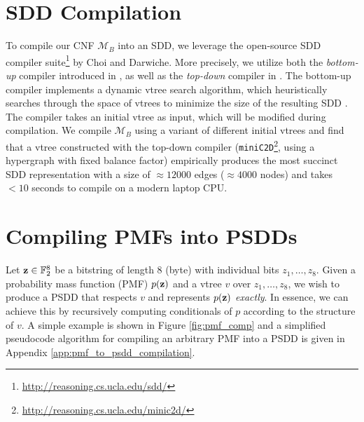 \section{SDD Compilation}
To compile our CNF $\mathcal{M}_B$ into an SDD, we leverage the open-source SDD compiler suite\footnote{\url{http://reasoning.cs.ucla.edu/sdd/}} by Choi and Darwiche. More precisely, we utilize both the \textit{bottom-up} compiler introduced in \cite{dynamic_min_choi}, as well as the \textit{top-down} compiler in \cite{top_down_comp}. The bottom-up compiler implements a dynamic vtree search algorithm, which heuristically searches through the space of vtrees to minimize the size of the resulting SDD \cite{dynamic_min_choi}. The compiler takes an initial vtree as input, which will be modified during compilation. We compile $\mathcal{M}_B$ using a variant of different initial vtrees and find that a vtree constructed with the top-down compiler \cite{top_down_comp} (\texttt{miniC2D}\footnote{\url{http://reasoning.cs.ucla.edu/minic2d/}}, using a hypergraph with fixed balance factor) empirically produces the most succinct SDD representation with a size of $\approx 12000$ edges ($\approx 4000$ nodes) and takes $< 10$ seconds to compile on a modern laptop CPU.


\section{Compiling PMFs into PSDDs}

Let $\mathbf{z} \in \mathbb{F}^8_2$ be a bitstring of length $8$ (byte) with individual bits $z_1,\dots,z_8$.
Given a probability mass function (PMF) $p(\mathbf{z})$ and a vtree $v$ over $z_1,\dots,z_8$, we wish to produce a PSDD that respects $v$ and represents $p(\mathbf{z})$ \textit{exactly}. In essence, we can achieve this by recursively computing conditionals of $p$ according to the structure of $v$. A simple example is shown in Figure \ref{fig:pmf_comp} and a simplified pseudocode algorithm for compiling an arbitrary PMF into a PSDD is given in Appendix \ref{app:pmf_to_psdd_compilation}.

